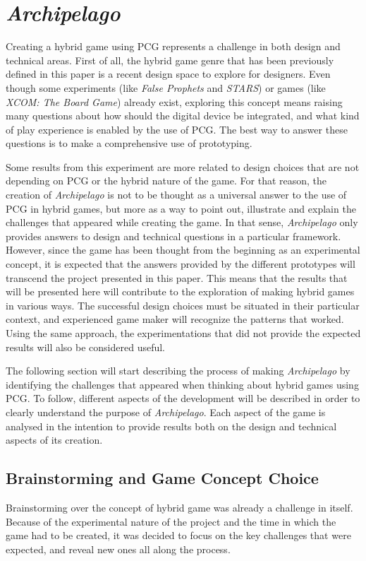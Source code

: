 \chapter{\textit{Archipelago}}
Creating a hybrid game using PCG represents a challenge in both design and technical areas. First of all, the hybrid game genre that has been previously defined in this paper is a recent design space to explore for designers. Even though some experiments (like \textit{False Prophets} and \textit{STARS}) or games (like \textit{XCOM: The Board Game}) already exist, exploring this concept means raising many questions about how should the digital device be integrated, and what kind of play experience is enabled by the use of PCG. The best way to answer these questions is to make a comprehensive use of prototyping.

Some results from this experiment are more related to design choices that are not depending on PCG or the hybrid nature of the game. For that reason, the creation of \textit{Archipelago} is not to be thought as a universal answer to the use of PCG in hybrid games, but more as a way to point out, illustrate and explain the challenges that appeared while creating the game. In that sense, \textit{Archipelago} only provides answers to design and technical questions in a particular framework. However, since the game has been thought from the beginning as an experimental concept, it is expected that the answers provided by the different prototypes will transcend the project presented in this paper. This means that the results that will be presented here will contribute to the exploration of making hybrid games in various ways. The successful design choices must be situated in their particular context, and experienced game maker will recognize the patterns that worked. Using the same approach, the experimentations that did not provide the expected results will also be considered useful.

The following section will start describing the process of making \textit{Archipelago} by identifying the challenges that appeared when thinking about hybrid games using PCG. To follow, different aspects of the development will be described in order to clearly understand the purpose of \textit{Archipelago}. Each aspect of the game is analysed in the intention to provide results both on the design and technical aspects of its creation. 
\section{Brainstorming and Game Concept Choice}
Brainstorming over the concept of hybrid game was already a challenge in itself. Because of the experimental nature of the project and the time in which the game had to be created, it was decided to focus on the key challenges that were expected, and reveal new ones all along the process.
